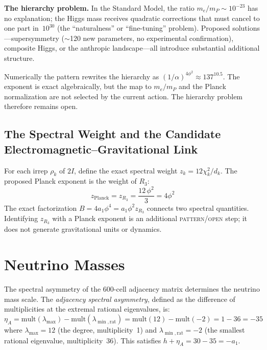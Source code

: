 \documentclass[12pt,a4paper]{article}
\theoremstyle{definition}
\begin{document}
\textbf{The hierarchy problem.}  In the Standard Model, the ratio $m_e/m_P \sim 10^{-23}$ has no explanation; the Higgs mass receives quadratic corrections that must cancel to one part in~$10^{30}$ (the ``naturalness'' or ``fine-tuning'' problem).  Proposed solutions---supersymmetry ($\sim$120 new parameters, no experimental confirmation), composite Higgs, or the anthropic landscape---all introduce substantial additional structure.

Numerically the pattern rewrites the hierarchy as $(1/\alpha)^{4\phi^2}\approx137^{10.5}$.  The exponent is exact algebraically, but the map to $m_e/m_P$ and the Planck normalization are not selected by the current action.  The hierarchy problem therefore remains open.

\subsection{The Spectral Weight and the Candidate Electromagnetic--Gravitational Link}
\label{sec:spectral_weight}

For each irrep $\rho_k$ of $2I$, define the exact spectral weight
$z_k=12\chi_k^2/d_k$.  The proposed Planck exponent is the weight of $R_3$:
\begin{equation}
\boxed{z_{\text{Planck}} = z_{R_3} = \frac{12\,\phi^2}{3} = 4\phi^2}
\label{eq:zP_spectral}
\end{equation}
The exact factorization $B=4a_1\phi^4=a_1\phi^2z_{R_3}$ connects two
spectral quantities.  Identifying $z_{R_3}$ with a Planck exponent is an
additional \textsc{pattern/open} step; it does not generate gravitational
units or dynamics.



\section{Neutrino Masses}
\label{sec:neutrinos}

The spectral asymmetry of the 600-cell adjacency matrix determines the neutrino mass scale. The \emph{adjacency spectral asymmetry}, defined as the difference of multiplicities at the extremal rational eigenvalues, is:
\begin{equation}
\eta_A = \text{mult}(\lambda_{\max}) - \text{mult}(\lambda_{\min,\text{rat}}) = \text{mult}(12) - \text{mult}(-2) = 1 - 36 = -35
\end{equation}
where $\lambda_{\max} = 12$ (the degree, multiplicity~1) and $\lambda_{\min,\text{rat}} = -2$ (the smallest rational eigenvalue, multiplicity~36).  This satisfies $h + \eta_A = 30 - 35 = -a_1$.
\end{document}
